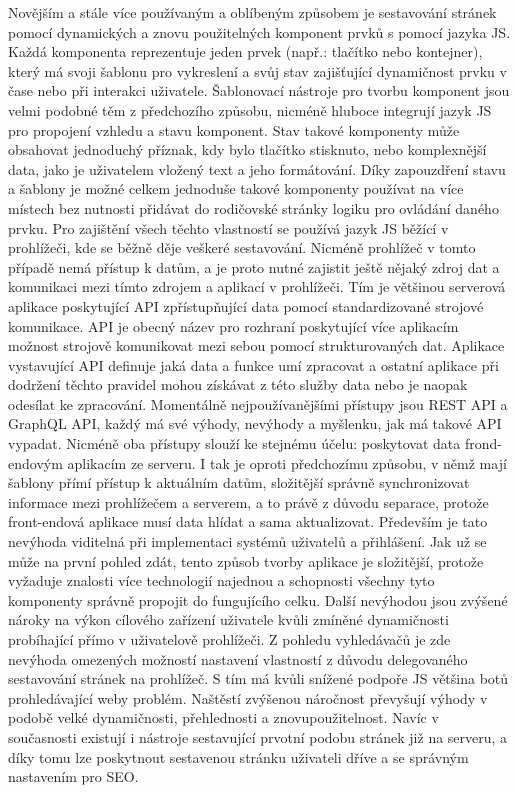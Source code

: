 	Novějším a stále více používaným a oblíbeným způsobem je sestavování stránek pomocí dynamických a znovu použitelných
	komponent prvků s pomocí jazyka \ac{JS}.
	Každá komponenta reprezentuje jeden prvek (např.: tlačítko nebo kontejner), který má svoji šablonu pro vykreslení
	a svůj stav zajišťující dynamičnost prvku v čase nebo při interakci uživatele.
	Šablonovací nástroje pro tvorbu komponent jsou velmi podobné těm z předchozího způsobu, nicméně hluboce integrují
	jazyk \ac{JS} pro propojení vzhledu a stavu komponent.
	Stav takové komponenty může obsahovat jednoduchý příznak, kdy bylo tlačítko stisknuto, nebo komplexnější
	data, jako je uživatelem vložený text a jeho formátování.
	Díky zapouzdření stavu a šablony je možné celkem jednoduše takové komponenty používat na více místech bez
	nutnosti přidávat do rodičovské stránky logiku pro ovládání daného prvku.
	Pro zajištění všech těchto vlastností se používá jazyk \ac{JS} běžící v prohlížeči, kde se běžně
	děje veškeré sestavování.
	Nicméně prohlížeč v tomto případě nemá přístup k datům, a je proto nutné zajistit ještě nějaký zdroj dat a komunikaci
	mezi tímto zdrojem a aplikací v prohlížeči.
	Tím je většinou serverová aplikace poskytující \ac{API} zpřístupňující data pomocí standardizované strojové komunikace.
	\ac{API} je obecný název pro rozhraní poskytující více aplikacím možnost strojově komunikovat mezi sebou pomocí
	strukturovaných dat.
	Aplikace vystavující \ac{API} definuje jaká data a funkce umí zpracovat a ostatní aplikace při dodržení těchto pravidel
	mohou získávat z této služby data nebo je naopak odesílat ke zpracování.
	Momentálně nejpoužívanějšími přístupy jsou \ac{REST} \ac{API} a GraphQL \ac{API}, každý má své výhody, nevýhody
	a myšlenku, jak má takové \ac{API} vypadat.
	Nicméně oba přístupy slouží ke stejnému účelu: poskytovat data frond-endovým aplikacím ze serveru.
	I tak je oproti předchozímu způsobu, v němž mají šablony přímí přístup k aktuálním datům, složitější správně synchronizovat
	informace mezi prohlížečem a serverem, a to právě z důvodu separace, protože front-endová aplikace musí data
	hlídat a sama aktualizovat.
	Především je tato nevýhoda viditelná při implementaci systémů uživatelů a přihlášení.
	Jak už se může na první pohled zdát, tento způsob tvorby aplikace je složitější, protože vyžaduje znalosti více technologií
	najednou a schopnosti všechny tyto komponenty správně propojit do fungujícího celku.
	Další nevýhodou jsou zvýšené nároky na výkon cílového zařízení uživatele kvůli zmíněné dynamičnosti probíhající přímo
	v uživatelově prohlížeči.
	Z pohledu vyhledávačů je zde nevýhoda omezených možností nastavení  vlastností z důvodu delegovaného sestavování
	stránek na prohlížeč.
	S tím má kvůli snížené podpoře \ac{JS} většina botů prohledávající weby problém.
	Naštěstí zvýšenou náročnost převyšují výhody v podobě velké dynamičnosti, přehlednosti a znovupoužitelnost.
	Navíc v současnosti existují i nástroje sestavující prvotní podobu stránek již na serveru, a díky tomu lze poskytnout sestavenou
	stránku uživateli dříve a se správným nastavením pro \ac{SEO}.

